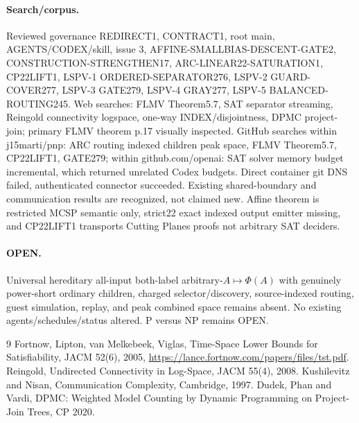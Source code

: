 \documentclass[11pt]{article}
\begin{document}
\paragraph{Search/corpus.} Reviewed governance REDIRECT1, CONTRACT1, root main, AGENTS/CODEX/skill, issue 3, AFFINE-SMALLBIAS-DESCENT-GATE2, CONSTRUCTION-STRENGTHEN17, ARC-LINEAR22-SATURATION1, CP22LIFT1, LSPV-1 ORDERED-SEPARATOR276, LSPV-2 GUARD-COVER277, LSPV-3 GATE279, LSPV-4 GRAY277, LSPV-5 BALANCED-ROUTING245. Web searches: FLMV Theorem5.7, SAT separator streaming, Reingold connectivity logspace, one-way INDEX/disjointness, DPMC project-join; primary FLMV theorem p.17 visually inspected. GitHub searches within j15marti/pnp: ARC routing indexed children peak space, FLMV Theorem5.7, CP22LIFT1, GATE279; within github.com/openai: SAT solver memory budget incremental, which returned unrelated Codex budgets. Direct container git DNS failed, authenticated connector succeeded. Existing shared-boundary and communication results are recognized, not claimed new. Affine theorem is restricted MCSP semantic only, strict22 exact indexed output emitter missing, and CP22LIFT1 transports Cutting Planes proofs not arbitrary SAT deciders.
\paragraph{OPEN.} Universal hereditary all-input both-label arbitrary-$A\mapsto\Phi(A)$ with genuinely power-short ordinary children, charged selector/discovery, source-indexed routing, guest simulation, replay, and peak combined space remains absent. No existing agents/schedules/status altered. P versus NP remains OPEN.
\begin{thebibliography}{9}
 Fortnow, Lipton, van Melkebeek, Viglas, Time-Space Lower Bounds for Satisfiability, JACM 52(6), 2005, \url{https://lance.fortnow.com/papers/files/tst.pdf}.
 Reingold, Undirected Connectivity in Log-Space, JACM 55(4), 2008.
 Kushilevitz and Nisan, Communication Complexity, Cambridge, 1997.
 Dudek, Phan and Vardi, DPMC: Weighted Model Counting by Dynamic Programming on Project-Join Trees, CP 2020.
\end{thebibliography}
\end{document}
